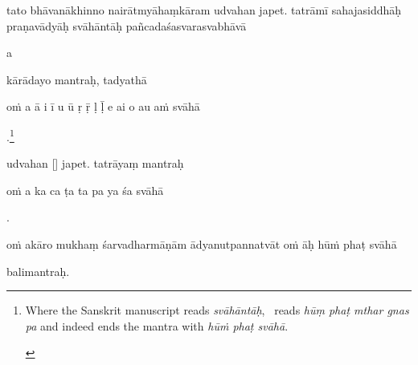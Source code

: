 \documentclass[naipra.tex]{subfiles}
\begin{document}
\begin{sanskrit}


\pstart
tato bhāvanākhinno nairātmyāhaṃkāram udvahan  japet.
tatrāmī sahajasiddhāḥ praṇavādyāḥ svāhāntāḥ pañcadaśasvarasvabhāvā \begin{mantra}a\end{mantra}\dsh kārādayo mantraḥ, tadyathā\Emdash \begin{mantra}oṁ a ā i ī u ū ṛ ṝ ḷ ḹ e ai o au aṁ svāhā\end{mantra}.\footnote{
	\begin{english}%
		Where the Sanskrit manuscript reads \emph{svāhāntāḥ}, \TIB\ reads \emph{hūṃ phaṭ mthar gnas pa} and indeed ends the mantra with \emph{hūṁ phaṭ svāhā}.
	\end{english}
}
\pend


\pstart
{} udvahan [] japet.
tatrāyaṃ mantraḥ\Emdash \begin{mantra}oṁ a ka ca ṭa ta pa ya śa svāhā\end{mantra}.
\pend


\pstart
\begin{mantra}oṁ akāro mukhaṃ śarvadharmāṇām ādyanutpannatvāt oṁ āḥ hūṁ phaṭ svāhā\end{mantra}\Emdash balimantraḥ. 
\pend


\end{sanskrit}
\end{document}
